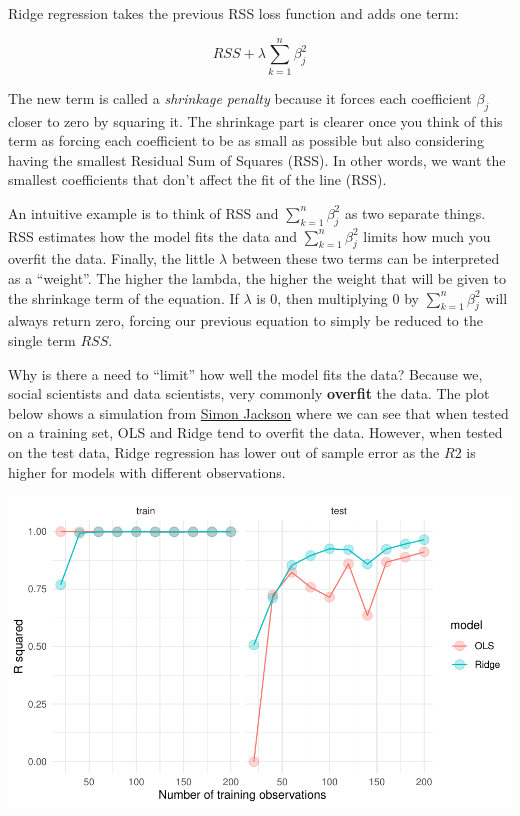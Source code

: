 \documentclass[
]{book}
\begin{document}
Ridge regression takes the previous RSS loss function and adds one term:

\begin{equation}
RSS + \lambda \sum_{k = 1}^n \beta^2_j
\end{equation}

The new term is called a \emph{shrinkage penalty} because it forces each coefficient \(\beta_j\) closer to zero by squaring it. The shrinkage part is clearer once you think of this term as forcing each coefficient to be as small as possible but also considering having the smallest Residual Sum of Squares (RSS). In other words, we want the smallest coefficients that don't affect the fit of the line (RSS).

An intuitive example is to think of RSS and \(\sum_{k = 1}^n \beta^2_j\) as two separate things. RSS estimates how the model fits the data and \(\sum_{k = 1}^n \beta^2_j\) limits how much you overfit the data. Finally, the little \(\lambda\) between these two terms can be interpreted as a ``weight''. The higher the lambda, the higher the weight that will be given to the shrinkage term of the equation. If \(\lambda\) is 0, then multiplying 0 by \(\sum_{k = 1}^n \beta^2_j\) will always return zero, forcing our previous equation to simply be reduced to the single term \(RSS\).

Why is there a need to ``limit'' how well the model fits the data? Because we, social scientists and data scientists, very commonly \textbf{overfit} the data. The plot below shows a simulation from \href{https://drsimonj.svbtle.com/ridge-regression-with-glmnet}{Simon Jackson} where we can see that when tested on a training set, OLS and Ridge tend to overfit the data. However, when tested on the test data, Ridge regression has lower out of sample error as the \(R2\) is higher for models with different observations.

\begin{center}\includegraphics[width=0.8\linewidth]{./figs/unnamed-chunk-1-1} \end{center}
\end{document}
